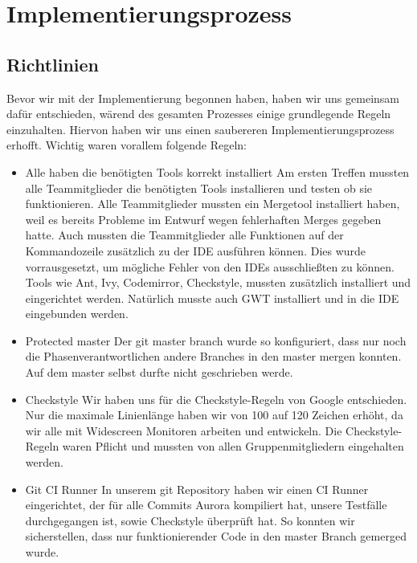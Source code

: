 \documentclass[parskip=full,11pt,twoside]{scrartcl}
\begin{document}
\section{Implementierungsprozess}
\subsection{Richtlinien}
Bevor wir mit der Implementierung begonnen haben, haben wir uns gemeinsam dafür entschieden,
wärend des gesamten Prozesses einige grundlegende Regeln einzuhalten.
Hiervon haben wir uns einen saubereren Implementierungsprozess erhofft.
Wichtig waren vorallem folgende Regeln:
\begin{itemize}
	\item Alle haben die benötigten Tools korrekt installiert
	\newline
	Am ersten Treffen mussten alle Teammitglieder die benötigten Tools installieren und testen ob sie funktionieren.
	Alle Teammitglieder mussten ein Mergetool installiert haben, weil es bereits Probleme im Entwurf wegen fehlerhaften Merges gegeben hatte.
	Auch mussten die Teammitglieder alle Funktionen auf der Kommandozeile zusätzlich 	zu der IDE ausführen können. Dies wurde vorrausgesetzt, um mögliche Fehler von den IDEs ausschließten zu können.
	Tools wie Ant, Ivy, Codemirror, Checkstyle, mussten zusätzlich installiert und eingerichtet werden.
	Natürlich musste auch GWT installiert und in die IDE eingebunden werden.

    \item Protected master
        \newline
        Der git master branch wurde so konfiguriert, dass nur noch die Phasenverantwortlichen andere Branches in den master mergen konnten.
        Auf dem master selbst durfte nicht geschrieben werde.
    \item Checkstyle
    \newline
    Wir haben uns für die Checkstyle-Regeln von Google entschieden. Nur die maximale Linienlänge haben wir von 100 auf 120 Zeichen erhöht, da wir alle mit Widescreen Monitoren arbeiten und entwickeln. Die Checkstyle-Regeln waren Pflicht und mussten von allen Gruppenmitgliedern eingehalten werden.
    \item Git CI Runner
        \newline
        In unserem git Repository haben wir einen CI Runner eingerichtet, der für alle Commits Aurora kompiliert hat, unsere Testfälle durchgegangen ist, sowie Checkstyle überprüft hat.
        So konnten wir sicherstellen, dass nur funktionierender Code in den master Branch gemerged wurde.


\end{itemize}
\end{document}
